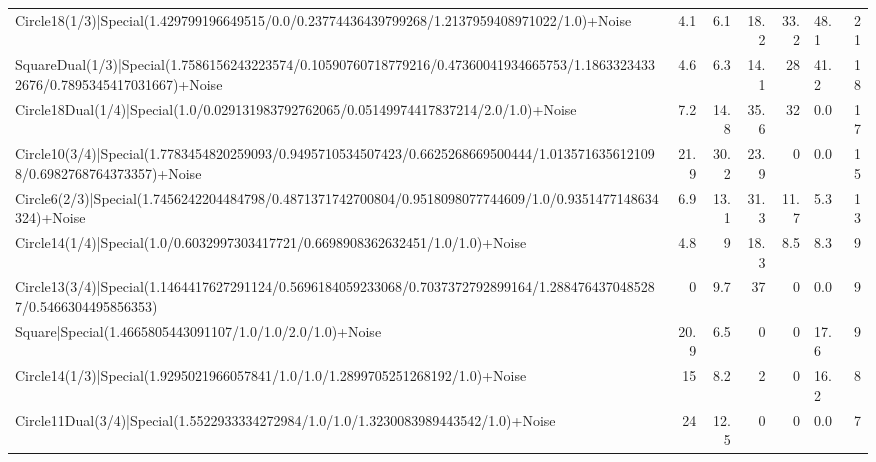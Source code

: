 \begin{tabular}{lrrrrlr}
 Circle18(1/3)|Special(1.429799196649515/0.0/0.23774436439799268/1.2137959408971022/1.0)+Noise                                 &             4.1 &            6.1 &            18.2 &            33.2 & 48.1            &           21 \\
 SquareDual(1/3)|Special(1.7586156243223574/0.10590760718779216/0.47360041934665753/1.18633234332676/0.7895345417031667)+Noise &             4.6 &            6.3 &            14.1 &            28   & 41.2            &           18 \\
 Circle18Dual(1/4)|Special(1.0/0.029131983792762065/0.05149974417837214/2.0/1.0)+Noise                                         &             7.2 &           14.8 &            35.6 &            32   & 0.0             &           17 \\
 Circle10(3/4)|Special(1.7783454820259093/0.9495710534507423/0.6625268669500444/1.0135716356121098/0.6982768764373357)+Noise   &            21.9 &           30.2 &            23.9 &             0   & 0.0             &           15 \\
 Circle6(2/3)|Special(1.7456242204484798/0.4871371742700804/0.9518098077744609/1.0/0.9351477148634324)+Noise                   &             6.9 &           13.1 &            31.3 &            11.7 & 5.3             &           13 \\
 Circle14(1/4)|Special(1.0/0.6032997303417721/0.6698908362632451/1.0/1.0)+Noise                                                &             4.8 &            9   &            18.3 &             8.5 & 8.3             &            9 \\
 Circle13(3/4)|Special(1.1464417627291124/0.5696184059233068/0.7037372792899164/1.2884764370485287/0.5466304495856353)         &             0   &            9.7 &            37   &             0   & 0.0             &            9 \\
 Square|Special(1.4665805443091107/1.0/1.0/2.0/1.0)+Noise                                                                      &            20.9 &            6.5 &             0   &             0   & 17.6            &            9 \\
 Circle14(1/3)|Special(1.9295021966057841/1.0/1.0/1.2899705251268192/1.0)+Noise                                                &            15   &            8.2 &             2   &             0   & 16.2            &            8 \\
 Circle11Dual(3/4)|Special(1.5522933334272984/1.0/1.0/1.3230083989443542/1.0)+Noise                                            &            24   &           12.5 &             0   &             0   & 0.0             &            7 \\

\end{tabular}
